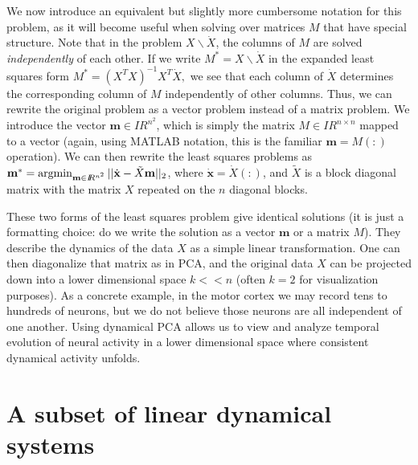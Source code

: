 \documentclass[11pt]{article}%
\def\x{{\mathbf x}}
\def\m{{\mathbf m}}
\newcommand{\reals}{I\!\!R} %
\def\argmin{\qopname\relax n{argmin}}
\begin{document}
We now introduce an equivalent but slightly more cumbersome notation for this problem, as it will become useful when solving over matrices $M$ that have special structure.   Note that in the problem $X\backslash\dot X$, the columns of $M$ are solved \emph{independently} of each other.  If we write $M^* = X\backslash\dot X$ in the expanded least squares form $M^* = (X^TX)^{-1}X^T\dot X,$ we see that each column of $\dot X$ determines the corresponding column of $M$ independently of other columns.  Thus, we can rewrite the original problem as a vector problem instead of a matrix problem.  We introduce the vector $\m \in \reals^{n^2}$, which is simply the matrix $M \in \reals^{n \times n}$ mapped to a vector (again, using MATLAB notation, this is the familiar $\m = M(:)$ operation).  We can then rewrite the least squares problems as $\m^* = \argmin_{\m \in \reals^{n^2}} || \dot \x - \tilde{X} \m ||_2$, where $\dot \x = \dot X(:)$, and $\tilde{X}$ is a block diagonal matrix with the matrix $X$ repeated on the $n$ diagonal blocks.   

These two forms of the least squares problem give identical solutions (it is just a formatting choice: do we write the solution as a vector $\m$ or a matrix $M$).  They describe the dynamics of the data $X$ as a simple linear transformation.  One can then diagonalize that matrix as in PCA, and the original data $X$ can be projected down into a lower dimensional space $k << n$ (often $k=2$ for visualization purposes).  As a concrete example, in the motor cortex we may record tens to hundreds of neurons, but we do not believe those neurons are all independent of one another.  Using dynamical PCA allows us to view and analyze temporal evolution of neural activity in a lower dimensional space where consistent dynamical activity unfolds. 


\section*{A subset of linear dynamical systems}
\end{document}
